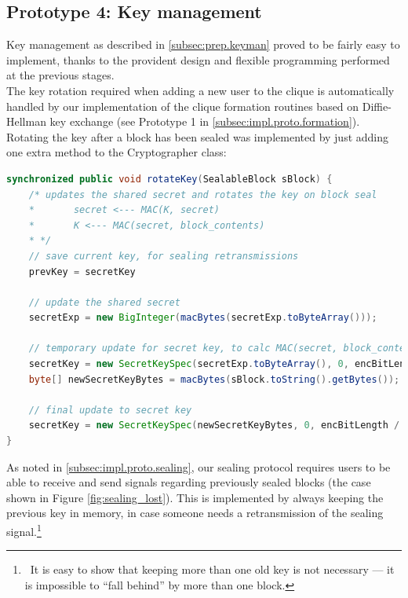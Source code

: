 \documentclass[a4paper, 12pt]{report}
\begin{document}
\subsection{Prototype 4: Key management}
Key management as described in \cref{subsec:prep.keyman} proved to be fairly easy to implement, thanks to the provident design and flexible programming performed at the previous stages. \\

The key rotation required when adding a new user to the clique is automatically handled by our implementation of the clique formation routines based on Diffie-Hellman key exchange (see Prototype 1 in \cref{subsec:impl.proto.formation}). \\

Rotating the key after a block has been sealed was implemented by just adding one extra method to the Cryptographer class:

\begin{lstlisting}[language=Java, columns=fullflexible, basicstyle=\scriptsize\ttfamily]
synchronized public void rotateKey(SealableBlock sBlock) {
    /* updates the shared secret and rotates the key on block seal
    *       secret <--- MAC(K, secret)
    *       K <--- MAC(secret, block_contents)
    * */ 
    // save current key, for sealing retransmissions
    prevKey = secretKey
    
    // update the shared secret
    secretExp = new BigInteger(macBytes(secretExp.toByteArray()));

    // temporary update for secret key, to calc MAC(secret, block_content)
    secretKey = new SecretKeySpec(secretExp.toByteArray(), 0, encBitLength / 8, encAlgo);
    byte[] newSecretKeyBytes = macBytes(sBlock.toString().getBytes());

    // final update to secret key
    secretKey = new SecretKeySpec(newSecretKeyBytes, 0, encBitLength / 8, encAlgo);
}
\end{lstlisting}
As noted in \cref{subsec:impl.proto.sealing}, our sealing protocol requires users to be able to receive and send signals regarding previously sealed blocks (the case shown in Figure \ref{fig:sealing_lost}). This is implemented by always keeping the previous key in memory, in case someone needs a retransmission of the sealing signal.\footnote{~It is easy to show that keeping more than one old key is not necessary --- it is impossible to ``fall behind'' by more than one block.}
\end{document}
